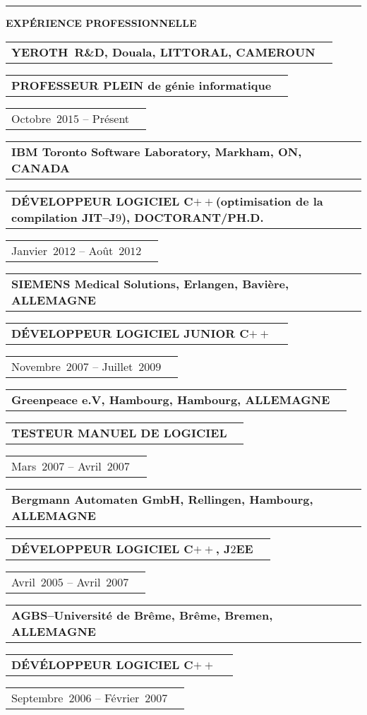 \documentclass[9pt,a4paper]{article} %
\makeatletter
\newcommand{\headerrow}[2]
{\begin{tabular*}{\linewidth}{l@{\extracolsep{\fill}}r}
	#1 &
	#2 \\
\end{tabular*}}
\newcommand{\jtwoee}{J$2$EE\xspace}
\newcommand{\cplusplus}{C$++$\xspace}
\newcommand{\cvitemdate}[2]{#1~$#2$\xspace}
\newcommand{\cvitempositionheld}[1]{\textbf{#1}\xspace}
\makeatother
\begin{document}
\vspace{1em}


\hrule
\begin{center}
{\large \textbf{EXPÉRIENCE PROFESSIONNELLE}}
\end{center}

\vspace{0.5em}

\headerrow
	{\textbf{YEROTH~R\&D, Douala, LITTORAL, CAMEROUN}}
	{}
\headerrow
	{\cvitempositionheld{PROFESSEUR PLEIN de génie informatique}}
	{}
\headerrow
	{\cvitemdate{Octobre}{2015} -- Présent}	
	{}
	
\vspace{0.3em}

\headerrow
	{\textbf{IBM Toronto Software Laboratory, Markham, ON, CANADA}}	
	{}
\headerrow
	{\cvitempositionheld{DÉVELOPPEUR LOGICIEL \cplusplus (optimisation de la compilation JIT--J$9$), DOCTORANT/PH.D.}}
	{}
\headerrow
	{\cvitemdate{Janvier}{2012} -- \cvitemdate{Août}{2012}}	
	{}

\vspace{0.3em}

\headerrow
	{\textbf{SIEMENS Medical Solutions, Erlangen, Bavière, ALLEMAGNE}}	
	{}
\headerrow
	{\cvitempositionheld{DÉVELOPPEUR LOGICIEL JUNIOR \cplusplus}}
	{}
\headerrow
	{\cvitemdate{Novembre}{2007} -- \cvitemdate{Juillet}{2009}}	
	{}
	
\vspace{0.3em}

\headerrow
	{\textbf{Greenpeace e.V, Hambourg, Hambourg, ALLEMAGNE}}	
	{}
\headerrow
	{\cvitempositionheld{TESTEUR MANUEL DE LOGICIEL}}
	{}
\headerrow
	{\cvitemdate{Mars}{2007} -- \cvitemdate{Avril}{2007}}	
	{}	

\vspace{0.3em}

\headerrow
	{\textbf{Bergmann Automaten GmbH, Rellingen, Hambourg, ALLEMAGNE}}	
	{}
\headerrow
	{\cvitempositionheld{DÉVELOPPEUR LOGICIEL \cplusplus, \jtwoee}}
	{}
\headerrow
	{\cvitemdate{Avril}{2005} -- \cvitemdate{Avril}{2007}}	
	{}
	
\vspace{0.3em}

\headerrow
	{\textbf{AGBS--Université de Brême, Brême, Bremen, ALLEMAGNE}}	
	{}
\headerrow
	{\cvitempositionheld{DÉVÉLOPPEUR LOGICIEL \cplusplus}}
	{}
\headerrow
	{\cvitemdate{Septembre}{2006} -- \cvitemdate{Février}{2007}}	
	{}

\vspace{0.3em}
\end{document}
